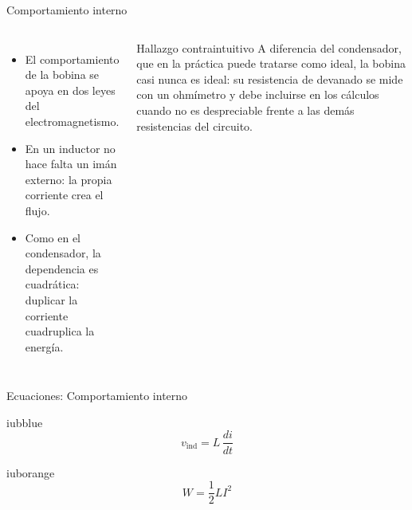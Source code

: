 \documentclass[aspectratio=169,11pt,xcolor={table}]{beamer}
\begin{document}
\begin{frame}{Comportamiento interno}
\begin{columns}[c,onlytextwidth]
\small
\begin{itemize}\setlength{\itemsep}{4pt}
  \item El comportamiento de la bobina se apoya en dos leyes del electromagnetismo.
  \item En un inductor no hace falta un imán externo: la propia corriente crea el flujo.
  \item Como en el condensador, la dependencia es cuadrática: duplicar la corriente cuadruplica la energía.
\end{itemize}
\begin{cardO}{Hallazgo contraintuitivo}
\footnotesize A diferencia del condensador, que en la práctica puede tratarse como ideal, la bobina casi nunca es ideal: su resistencia de devanado se mide con un ohmímetro y debe incluirse en los cálculos cuando no es despreciable frente a las demás resistencias del circuito.
\end{cardO}
\end{columns}
\end{frame}

\begin{frame}{Ecuaciones: Comportamiento interno}
\begin{cajaplana}{iubblue}
\centering
{\large
\begin{equation*}
  v_{\mathrm{ind}} = L\,\frac{di}{dt}
\end{equation*}
}
\end{cajaplana}
\vspace{1mm}
\begin{cajaplana}{iuborange}
\centering
{\large
\begin{equation*}
  W = \frac{1}{2} L I^{2}
\end{equation*}
}
\end{cajaplana}
\end{frame}
\end{document}
